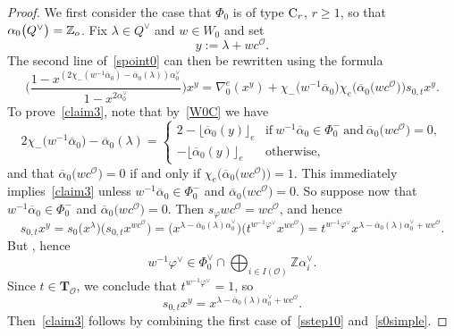 \documentclass[11pt]{article}
\numberwithin{equation}{section}
\numberwithin{equation}{section}
\begin{document}
\begin{proof}
We first consider the case that $\Phi_0$ is of type ${\rm C}_r$, $r\geq 1$, so that $\alpha_0\smash{\bigl(Q^\vee\bigr)}=\mathbb{Z}_o$.
Fix $\lambda\in Q^\vee$ and $w\in W_0$ and set
\[
y:=\lambda+wc^\mathcal{O}.
\]
The second line of~\eqref{spoint0} can then be rewritten using the formula
\begin{equation}\label{claim3}
\Biggl(\frac{1-x^{(2\chi_-(w^{-1}\overline{\alpha}_0)-\overline{\alpha}_0(\lambda))\alpha_0^\vee}}{1-x^{2\alpha_0^\vee}}\Biggr)x^{y}=
\nabla_0^e(x^y)
+\chi_-\bigl(w^{-1}\overline{\alpha}_0\bigr)\chi_e\bigl(\overline{\alpha}_0\bigl(wc^\mathcal{O}\bigr)\bigr)s_{0,t}x^{y}.
\end{equation}
To prove~\eqref{claim3}, note that by~\eqref{W0C} we have
\begin{equation}
\label{sstep10}
2\chi_-\bigl(w^{-1}\overline{\alpha}_0\bigr)-\overline{\alpha}_0(\lambda)=
\begin{cases}
2-\lfloor\overline{\alpha}_0(y)\rfloor_e &\text{if}\ w^{-1}\overline{\alpha}_0\in\Phi_0^-\ \text{and}\ \overline{\alpha}_0\bigl(wc^\mathcal{O}\bigr)=0,\\
-\lfloor\overline{\alpha}_0(y)\rfloor_e &\text{otherwise},
\end{cases}
\end{equation}
and that $\overline{\alpha}_0\bigl(wc^\mathcal{O}\bigr)=0$ if and only if $\chi_e\bigl(\overline{\alpha}_0\bigl(wc^\mathcal{O}\bigr)\bigr)=1$.
This immediately implies~\eqref{claim3} unless
$w^{-1}\overline{\alpha}_0\in\Phi_0^-$ and $\overline{\alpha}_0\bigl(wc^\mathcal{O}\bigr)=0$.
So suppose now that $w^{-1}\overline{\alpha}_0\in\Phi_0^-$ and $\overline{\alpha}_0\bigl(wc^\mathcal{O}\bigr)=0$. Then $s_\varphi wc^\mathcal{O}=wc^\mathcal{O}$, and hence
\[
s_{0,t}x^y=s_0\bigl(x^\lambda\bigr)\bigl(s_{0,t}x^{wc^\mathcal{O}}\bigr)=\bigl(x^{\lambda-\overline{\alpha}_0(\lambda)\alpha_0^\vee}\bigr)\bigl(t^{w^{-1}\varphi^\vee}x^{wc^\mathcal{O}}\bigr)
=t^{w^{-1}\varphi^\vee}x^{\lambda-\overline{\alpha}_0(\lambda)\alpha_0^\vee+wc^\mathcal{O}}.
\]
But , hence
\[
w^{-1}\varphi^\vee\in\Phi_0^\vee\cap\bigoplus_{i\in I(\mathcal{O})}\mathbb{Z}\alpha_i^\vee.
\]
 Since $t\in\mathbf{T}_\mathcal{O}$,
we conclude that ${t^{w^{-1}\varphi^\vee}=1}$, so
\begin{equation}\label{s0simple}
s_{0,t}x^y=x^{\lambda-\overline{\alpha}_0(\lambda)\alpha_0^\vee+wc^\mathcal{O}}.
\end{equation}
Then~\eqref{claim3} follows by combining the first case of~\eqref{sstep10} and~\eqref{s0simple}.


\end{proof}
\end{document}
